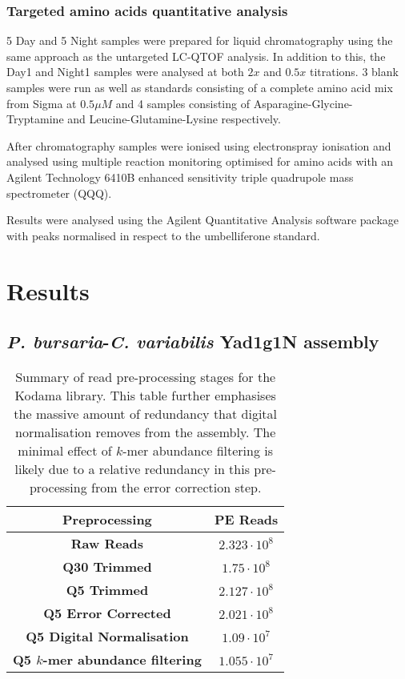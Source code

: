 \subsubsection{Targeted amino acids quantitative analysis}

5 Day and 5 Night samples were prepared for liquid chromatography
using the same approach as the untargeted LC-QTOF analysis.
In addition to this, the Day1 and Night1 samples were analysed at both
\(2x\) and \(0.5x\) titrations.  3 blank samples were run 
as well as standards consisting of a complete amino acid
mix from Sigma at \(0.5\mu M\) and 4 samples consisting of Asparagine-Glycine-Tryptamine
and Leucine-Glutamine-Lysine respectively.

After chromatography samples were ionised using electronspray ionisation
and analysed using multiple reaction monitoring optimised
for amino acids with an Agilent Technology
6410B enhanced sensitivity triple quadrupole mass spectrometer (QQQ).

Results were analysed using the Agilent Quantitative Analysis software package
with peaks normalised in respect to the umbelliferone standard. 

\section{Results}

\subsection{\textit{P. bursaria}-\textit{C. variabilis} Yad1g1N assembly}

\begin{table}
    \centering
    \begin{tabular}{|c|c|}
        \hline
        \textbf{Preprocessing} & \textbf{PE Reads} \\
        \hline
        \textbf{Raw Reads}  & \(2.323\cdot10^{8}\)\\
        \textbf{Q30 Trimmed} & \(1.75\cdot10^{8}\)\\
        \textbf{Q5 Trimmed}  & \(2.127\cdot10^{8} \) \\
        \textbf{Q5 Error Corrected}  & \(2.021\cdot10^{8}\)\\
        \textbf{Q5 Digital Normalisation} & \(1.09 \cdot10^{7}\)\\ 
        \textbf{Q5 \(k\)-mer abundance filtering} & \(1.055\cdot10^{7}\)\\
        \hline
    \end{tabular}
    \caption[Results of various types of pre-processing for the Yad1g1N transcriptome]{
        Summary of read pre-processing stages for the Kodama library.  This
        table further emphasises the massive amount of redundancy that digital normalisation 
        removes from the assembly. The minimal effect of \(k\)-mer abundance filtering
        is likely due to a relative redundancy in this pre-processing from the error
    correction step.}
    \label{tab:kodama_preproc}
\end{table}

